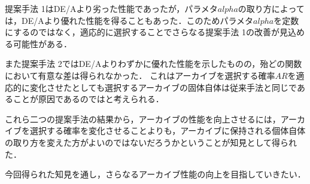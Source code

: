 \documentclass[a4paper,11pt,oneside,openany]{jsbook}
\begin{document}
提案手法 1はDE/Aより劣った性能であったが，パラメタ$alpha$の取り方によっては，DE/Aより優れた性能を得ることもあった．このためパラメタ$alpha$を定数にするのではなく，適応的に選択することでさらなる提案手法 1の改善が見込める可能性がある．

また提案手法 2ではDE/Aよりわずかに優れた性能を示したものの，殆どの関数において有意な差は得られなかった．
これはアーカイブを選択する確率$AR$を適応的に変化させたとしても選択するアーカイブの固体自体は従来手法と同じであることが原因であるのではと考えられる．

これら二つの提案手法の結果から，アーカイブの性能を向上させるには，アーカイブを選択する確率を変化させることよりも，アーカイブに保持される個体自体の取り方を変えた方がよいのではないだろうかということが知見として得られた．

今回得られた知見を通し，さらなるアーカイブ性能の向上を目指していきたい．
\end{document}
